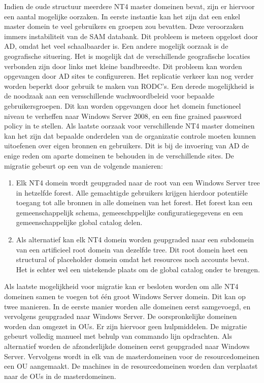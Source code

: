 Indien de oude structuur meerdere NT4 master domeinen bevat, zijn er hiervoor
een aantal mogelijke oorzaken. In eerste instantie kan het zijn dat een enkel
master domein te veel gebruikers en groepen zou bevatten. Deze veroorzaken
immers instabiliteit van de SAM databank. Dit probleem is meteen opgelost door
AD, omdat het veel schaalbaarder is. Een andere mogelijk oorzaak is de
geografische situering. Het is mogelijk dat de verschillende geografische
locaties verbonden zijn door links met kleine bandbreedte. Dit probleem kan
worden opgevangen door AD sites te configureren. Het replicatie verkeer kan nog
verder worden beperkt door gebruik te maken van RODC's. Een derede mogelijkheid
is de noodzaak aan een versschillende wachwoordbeleid voor bepaalde
gebruikersgroepen. Dit kan worden opgevangen door het domein functioneel niveau
te verheffen naar Windows Server 2008, en een fine grained password policy in te
stellen. Als laatste oorzaak voor verschillende NT4 master domeinen kan het zijn
dat bepaalde onderdelen van de organizatie controle moeten kunnen uitoefenen
over eigen bronnen en gebruikers. Dit is bij de invoering van AD de enige reden
om aparte domeinen te behouden in de verschillende sites. De migratie gebeurt op
een van de volgende manieren:
\begin{enumerate}
	\item Elk NT4 domein wordt geupgraded naar de root van een Windows
		Server tree in hetzelfde forest. Alle gemachtigde gebruikers
		krijgen hierdoor potentiële toegang tot alle bronnen in alle
		domeinen van het forest. Het forest kan een gemeenschappelijk
		schema, gemeeschppelijke configuratiegegevens en een
		gemeenschappelijke global catalog delen.
	\item Als alternatief kan elk NT4 domein worden geupgraded naar een
		subdomein van een artificieel root domein van dezelfde tree. Dit
		root domein heet een structural of placeholder domein omdat het
		resources noch accounts bevat. Het is echter wel een uistekende
		plaats om de global catalog onder te brengen.
\end{enumerate}

Als laatste mogelijkheid voor migratie kan er besloten worden om alle NT4
domeinen samen te voegen tot één groot Windows Server domein. Dit kan op twee
manieren. In de eerste manier worden alle domeinen eerst samgevoegd, en
vervolgens geupgraded naar Windows Server. De oorspronkelijke domeinen worden
dan omgezet in OUs. Er zijn hiervoor geen hulpmiddelen. De migratie gebeurt
volledig manueel met behulp van commando lijn opdrachten. Als alternatief worden
de afzonderlijkde domeinen eerst geupgraded naar Windows Server. Vervolgens
wordt in elk van de masterdomeinen voor de resourcedomeinen een OU aangemaakt.
De machines in de resourcedomeinen worden dan verplaatst naar de OUs in de
masterdomeinen.
